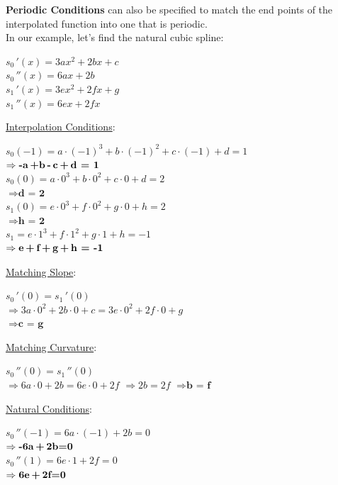 \documentclass[a4paper,12pt]{report}
\begin{document}
	\textbf{Periodic Conditions} can also be specified to match the end points of the interpolated function into one that
	is periodic.\\

	In our example, let's find the natural cubic spline:
\begin{center}
	$s_0\,'(x)=3ax^2+2bx+c$\\
	$s_0\,''(x)=6ax+2b$\\
	$s_1\,'(x)=3ex^2+2fx+g$\\
	$s_1\,''(x)=6ex+2fx$\\
\end{center}

\underline{Interpolation Conditions}:
\begin{center}
	$s_0(-1) = a\cdot(-1)^3+b\cdot(-1)^2+c\cdot(-1)+d = 1$\\
	\medskip
	$\Rightarrow \textbf{-a\,+b\,-\,c\,+\,d = 1}$\\
	\bigskip
	$s_0(0) = a \cdot 0^3 + b \cdot 0^2 + c \cdot 0 + d = 2$\\
	\medskip
	$\Rightarrow \textbf{d = 2}$\\
	\bigskip
	$s_1(0) = e \cdot 0^3 + f \cdot 0^2 + g \cdot 0 + h = 2$\\
	\medskip
	$\Rightarrow \textbf{h = 2}$\\
	\bigskip
	$s_1 = e\cdot1^3+f\cdot1^2+g\cdot1+h = -1$\\
	\medskip
	$\Rightarrow \textbf{e\,+\,f\,+\,g\,+\,h = -1}$
\end{center}

\underline{Matching Slope}:
\begin{center}
	$s_0\,'(0) = s_1\,'(0)$\\
	\medskip
	$\Rightarrow 3a \cdot 0^2 + 2b \cdot 0 + c = 3e \cdot 0^2 + 2f \cdot 0 + g$\\
	\medskip
	$\Rightarrow \textbf{c = g}$
\end{center}

\underline{Matching Curvature}:
\begin{center}
	$s_0\,''(0) = s_1\,''(0)$\\
	\medskip
	$\Rightarrow 6a \cdot 0 + 2b = 6e \cdot 0 + 2f$
	\medskip
	$\Rightarrow 2b = 2f$
	\medskip
	$\Rightarrow \textbf{b = f}$
\end{center}

\underline{Natural Conditions}:
\begin{center}
	$s_0\,''(-1) = 6a \cdot (-1) + 2b = 0$\\
	\medskip
	$\Rightarrow \textbf{-6a\,+\,2b=0}$\\
	\bigskip
	$s_0\,''(1) = 6e \cdot 1 + 2f = 0$\\
	\medskip
	$\Rightarrow \textbf{6e\,+\,2f=0}$
\end{center}
\end{document}
